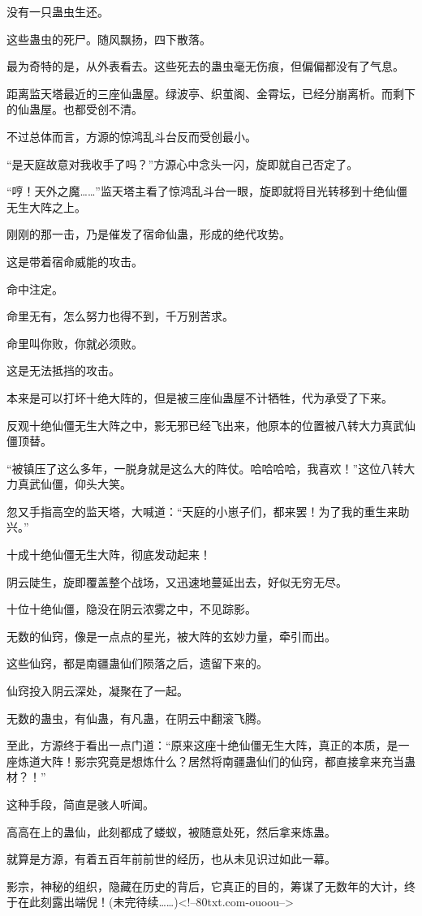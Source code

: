 \begin{this_body}
没有一只蛊虫生还。

这些蛊虫的死尸。随风飘扬，四下散落。

最为奇特的是，从外表看去。这些死去的蛊虫毫无伤痕，但偏偏都没有了气息。

距离监天塔最近的三座仙蛊屋。绿波亭、织茧阁、金霄坛，已经分崩离析。而剩下的仙蛊屋。也都受创不清。

不过总体而言，方源的惊鸿乱斗台反而受创最小。

“是天庭故意对我收手了吗？”方源心中念头一闪，旋即就自己否定了。

“哼！天外之魔……”监天塔主看了惊鸿乱斗台一眼，旋即就将目光转移到十绝仙僵无生大阵之上。

刚刚的那一击，乃是催发了宿命仙蛊，形成的绝代攻势。

这是带着宿命威能的攻击。

命中注定。

命里无有，怎么努力也得不到，千万别苦求。

命里叫你败，你就必须败。

这是无法抵挡的攻击。

本来是可以打坏十绝大阵的，但是被三座仙蛊屋不计牺牲，代为承受了下来。

反观十绝仙僵无生大阵之中，影无邪已经飞出来，他原本的位置被八转大力真武仙僵顶替。

“被镇压了这么多年，一脱身就是这么大的阵仗。哈哈哈哈，我喜欢！”这位八转大力真武仙僵，仰头大笑。

忽又手指高空的监天塔，大喊道：“天庭的小崽子们，都来罢！为了我的重生来助兴。”

十成十绝仙僵无生大阵，彻底发动起来！

阴云陡生，旋即覆盖整个战场，又迅速地蔓延出去，好似无穷无尽。

十位十绝仙僵，隐没在阴云浓雾之中，不见踪影。

无数的仙窍，像是一点点的星光，被大阵的玄妙力量，牵引而出。

这些仙窍，都是南疆蛊仙们陨落之后，遗留下来的。

仙窍投入阴云深处，凝聚在了一起。

无数的蛊虫，有仙蛊，有凡蛊，在阴云中翻滚飞腾。

至此，方源终于看出一点门道：“原来这座十绝仙僵无生大阵，真正的本质，是一座炼道大阵！影宗究竟是想炼什么？居然将南疆蛊仙们的仙窍，都直接拿来充当蛊材？！”

这种手段，简直是骇人听闻。

高高在上的蛊仙，此刻都成了蝼蚁，被随意处死，然后拿来炼蛊。

就算是方源，有着五百年前前世的经历，也从未见识过如此一幕。

影宗，神秘的组织，隐藏在历史的背后，它真正的目的，筹谋了无数年的大计，终于在此刻露出端倪！(未完待续……)<!--80txt.com-ouoou-->

\end{this_body}

